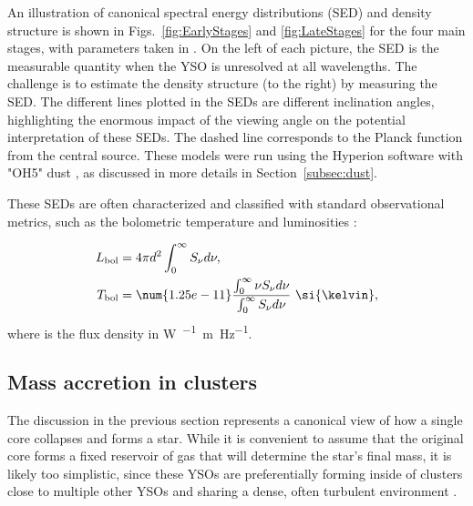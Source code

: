 An illustration of canonical spectral energy distributions (SED) and density structure is shown in Figs.~\ref{fig:EarlyStages} and \ref{fig:LateStages} for the four main stages, with parameters taken in \citet{Whitney:2003kc}. On the left of each picture, the SED is the measurable quantity when the YSO is unresolved at all wavelengths. The challenge is to estimate the density structure (to the right) by measuring the SED. The different lines plotted in the SEDs are different inclination angles, highlighting the enormous impact of the viewing angle on the potential interpretation of these SEDs. The dashed line corresponds to the Planck function from the central source. These models were run using the Hyperion software \citep{Robitaille:2011fc} with "OH5" dust \citep{Ossenkopf:1994tq}, as discussed in more details in Section~\ref{subsec:dust}.

These SEDs are often characterized and classified with standard observational metrics, such as the bolometric temperature and luminosities \citep{Myers:1993en,Dunham:2010bx}:

\begin{align}
\Lbol &= 4\pi d^2\int_0^\infty\Snu d\nu,\\
\Tbol &= \num{1.25e-11} \frac{\int_0^\infty \nu\Snu d\nu}{\int_0^\infty \Snu d\nu}~\si{\kelvin},
\end{align}
%
where \Snu is the flux density in \si{\watt\per{}\meter\per\hertz}. 

\subsection{Mass accretion in clusters}


The discussion in the previous section represents a canonical view of how a single core collapses and forms a star. While it is convenient to assume that the original core forms a fixed reservoir of gas that will determine the star's final mass, it is likely too simplistic, since these YSOs are preferentially forming inside of clusters close to multiple other YSOs and sharing a dense, often turbulent environment \citep{Porras:2003kxa,Allen:2007wqa,Gutermuth:2009gca}. 


